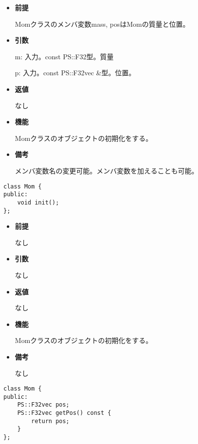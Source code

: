 \begin{itemize}

\item {\bf 前提}

  Momクラスのメンバ変数mass, posはMomの質量と位置。
  
\item {\bf 引数}

  m: 入力。const PS::F32型。質量

  p: 入力。const PS::F32vec \&型。位置。
  
\item {\bf 返値}

  なし

\item {\bf 機能}

  Momクラスのオブジェクトの初期化をする。
  
\item {\bf 備考}

  メンバ変数名の変更可能。メンバ変数を加えることも可能。

\end{itemize}


\begin{screen}
\begin{verbatim}
class Mom {
public:
    void init();
};
\end{verbatim}
\end{screen}

\begin{itemize}

\item {\bf 前提}

  なし
  
\item {\bf 引数}

  なし
  
\item {\bf 返値}

  なし

\item {\bf 機能}

  Momクラスのオブジェクトの初期化をする。
  
\item {\bf 備考}

  なし

\end{itemize}


\begin{screen}
\begin{verbatim}
class Mom {
public:
    PS::F32vec pos;
    PS::F32vec getPos() const {
        return pos;
    }
};
\end{verbatim}
\end{screen}

